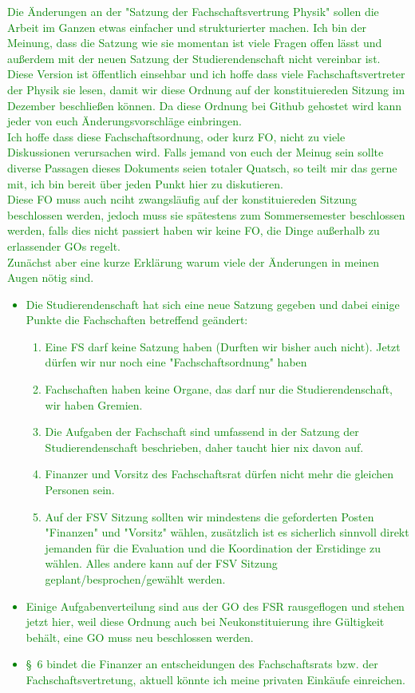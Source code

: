 \documentclass[
	a4paper,
	12pt,
	oneside,
	parskip=half-,
	pagesize,
	headsepline,
	german,
	ngerman
]{scrartcl}
\begin{document}
\textcolor{green}{Die Änderungen an der "Satzung der Fachschaftsvertrung  Physik" sollen die Arbeit im Ganzen etwas einfacher und strukturierter machen. Ich bin der Meinung, dass die Satzung wie sie momentan ist viele Fragen offen lässt und außerdem mit der neuen Satzung der Studierendenschaft nicht vereinbar ist. Diese Version ist öffentlich einsehbar und ich hoffe dass viele Fachschaftsvertreter der Physik sie lesen, damit wir diese Ordnung auf der konstituiereden Sitzung im Dezember beschließen können. Da diese Ordnung bei Github gehostet wird kann jeder von euch Änderungsvorschläge einbringen.\\
Ich hoffe dass diese Fachschaftsordnung, oder kurz FO, nicht zu viele Diskussionen verursachen wird. Falls jemand von euch der Meinug sein sollte diverse Passagen dieses Dokuments seien totaler Quatsch, so teilt mir das gerne mit, ich bin bereit über jeden Punkt hier zu diskutieren. \\ Diese FO muss auch nciht zwangsläufig auf der konstituiereden Sitzung beschlossen werden, jedoch muss sie spätestens zum Sommersemester beschlossen werden, falls dies nicht passiert haben wir keine FO, die Dinge außerhalb zu erlassender GOs regelt.\\
Zunächst aber eine kurze Erklärung warum viele der Änderungen in meinen Augen nötig sind. 
\begin{itemize}
	\item Die Studierendenschaft hat sich eine neue Satzung gegeben und dabei einige Punkte die Fachschaften betreffend geändert:
	\begin{enumerate}
		\item Eine FS darf keine Satzung haben (Durften wir bisher auch nicht). Jetzt dürfen wir nur noch eine "Fachschaftsordnung" haben
		\item Fachschaften haben keine Organe, das darf nur die Studierendenschaft, wir haben Gremien.
		\item Die Aufgaben der Fachschaft sind umfassend in der Satzung der Studierendenschaft beschrieben, daher taucht hier nix davon auf.
		\item Finanzer und Vorsitz des Fachschaftsrat dürfen nicht mehr die gleichen Personen sein. 
		\item Auf der FSV Sitzung sollten wir mindestens die geforderten Posten "Finanzen" und "Vorsitz" wählen, zusätzlich ist es sicherlich sinnvoll direkt jemanden für die Evaluation und die Koordination der Erstidinge zu wählen. Alles andere kann auf der FSV Sitzung geplant/besprochen/gewählt werden.
	\end{enumerate}
		\item Einige Aufgabenverteilung sind aus der GO des FSR rausgeflogen und stehen jetzt hier, weil diese Ordnung auch bei Neukonstituierung ihre Gültigkeit behält, eine GO muss neu beschlossen werden.
		\item §~6 bindet die Finanzer an entscheidungen des Fachschaftsrats bzw. der Fachschaftsvertretung, aktuell könnte ich meine privaten Einkäufe einreichen.
\end{itemize}
}
\end{document}
